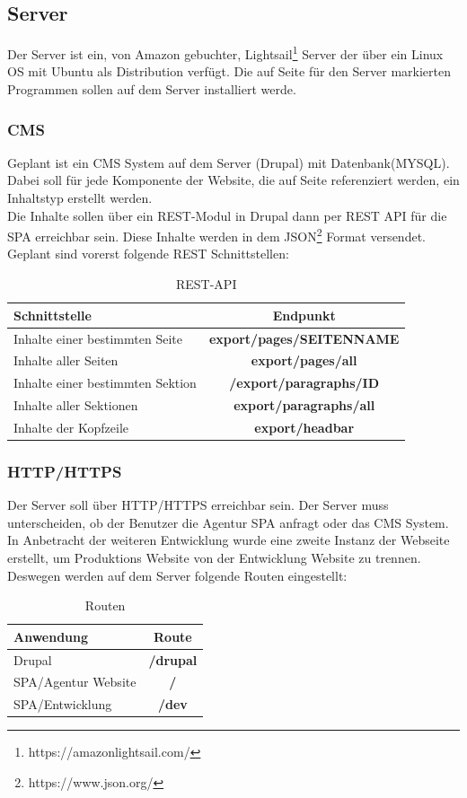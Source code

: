 \documentclass[11pt,a4paper]{article}
\begin{document}
\subsection{Server}
Der Server ist ein, von Amazon gebuchter, Lightsail\footnote{https://amazonlightsail.com/} Server der über ein Linux OS mit Ubuntu als Distribution verfügt. Die auf Seite \pageref{sec:progs} für den Server markierten Programmen sollen auf dem Server installiert werde.
\subsubsection{CMS}
Geplant ist ein CMS System auf dem Server (Drupal) mit Datenbank(MYSQL). Dabei soll für jede Komponente der Website, die auf Seite \pageref{sec:epage}
referenziert werden, ein Inhaltstyp erstellt werden.\\
Die Inhalte sollen über ein REST-Modul in Drupal dann per REST \acs{API} für die SPA erreichbar sein.
Diese Inhalte  werden in dem JSON\footnote{https://www.json.org/} Format versendet. 
Geplant sind vorerst folgende REST Schnittstellen:
\begin{table}[!ht]
  \centering
     \begin{tabular}{l|c}
       \textbf{Schnittstelle}  & \textbf{Endpunkt} \\
       \hline
       Inhalte einer bestimmten Seite & \textbf{export/pages/SEITENNAME} \\
       Inhalte aller Seiten & \textbf{export/pages/all} \\
       Inhalte einer bestimmten Sektion & \textbf{/export/paragraphs/ID} \\
       Inhalte aller Sektionen & \textbf{export/paragraphs/all}\\
       Inhalte der Kopfzeile & \textbf{export/headbar}\\
     \end{tabular}
\caption{REST-API}
\end{table}
\subsubsection{HTTP/HTTPS}
Der Server soll über HTTP/HTTPS erreichbar sein. Der Server muss unterscheiden, ob der Benutzer die Agentur SPA anfragt oder das CMS System. In Anbetracht der weiteren Entwicklung wurde eine zweite Instanz der Webseite erstellt, um Produktions Website von der Entwicklung Website zu trennen. Deswegen werden auf dem Server folgende Routen eingestellt:
\begin{table}[!ht]
  \centering
     \begin{tabular}{l|c}
       \textbf{Anwendung}  & \textbf{Route} \\
       \hline
       Drupal & \textbf{/drupal}\\
       SPA/Agentur Website & \textbf{/}\\
       SPA/Entwicklung & \textbf{/dev}\\ 
     \end{tabular}
\caption{Routen}
\end{table}
\end{document}
